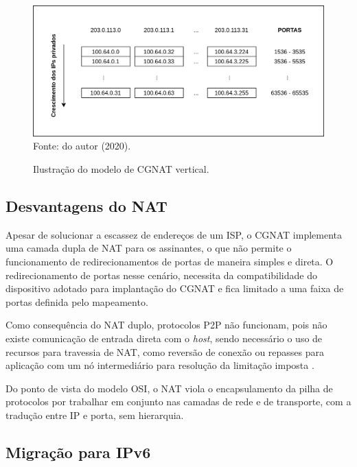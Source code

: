     \begin{figure}[!htb]
        \centering
        \caption{Ilustração do modelo de CGNAT vertical.} 
        \label{fig:cgnat_vertical} 
        \includegraphics[width=0.9\linewidth]{img/CGNAT-Vertical.png} \\
        {\small Fonte: do autor (2020).} 
    \end{figure}

\subsection{Desvantagens do NAT}

    Apesar de solucionar a escassez de endereços de um ISP, o CGNAT implementa uma camada dupla de NAT para os assinantes, o que não permite o funcionamento de redirecionamentos de portas de maneira simples e direta. O redirecionamento de portas nesse cenário, necessita da compatibilidade do dispositivo adotado para implantação do CGNAT e fica limitado a uma faixa de portas definida pelo mapeamento.
    
    Como consequência do NAT duplo, protocolos P2P não funcionam, pois não existe comunicação de entrada direta com o \textit{host}, sendo necessário o uso de recursos para travessia de NAT, como reversão de conexão ou repasses para aplicação com um nó intermediário para resolução da limitação imposta \cite{kurose2014}.
    
    Do ponto de vista do modelo OSI, o NAT viola o encapsulamento da pilha de protocolos por trabalhar em conjunto nas camadas de rede e de transporte, com a tradução entre IP e porta, sem hierarquia. 
    
\subsection{Migração para IPv6}
    
